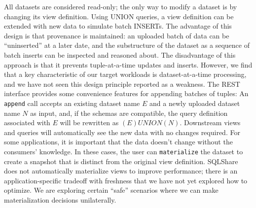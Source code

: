 \documentclass{sig-alternate}
\newcommand{\note}[2]{{\color{#1} {#2}}}
\newcommand{\reviewone}[1]{\note{black}{#1}}
\newcommand{\sqlshare}{SQLShare}
\begin{document}
All datasets are considered read-only; the only way to modify a dataset is by changing its view definition. Using UNION queries, a view definition can be extended with new data to simulate batch INSERTs.  The advantage of this design is that provenance is maintained: an uploaded batch of data can be ``uninserted'' at a later date, and the substructure of the dataset as a sequence of batch inserts can be inspected and reasoned about.  The disadvantage of this approach is that it prevents tuple-at-a-time updates and inserts.  However, we find that a key characteristic of our target workloads is dataset-at-a-time processing, and we have not seen this design principle reported as a weakness.  The REST interface provides some convenience features for appending batches of tuples: An \texttt{append} call accepts an existing dataset name $E$ and a newly uploaded dataset name $N$ as input, and, if the schemas are compatible, the query definition associated with $E$ will be rewritten as $(E) UNION (N)$.  Downstream views and queries will automatically see the new data with no changes required.  For some applications, it is important that the data doesn't change without the consumers' knowledge.  \reviewone{In these cases, the user can \texttt{materialize} the dataset to create a snapshot that is distinct from the original view definition. \sqlshare{} does not automatically materialize views to improve performance; there is an application-specific tradeoff with freshness that we have not yet explored how to optimize.  We are exploring certain ``safe'' scenarios where we can make materialization decisions unilaterally.}
\end{document}
